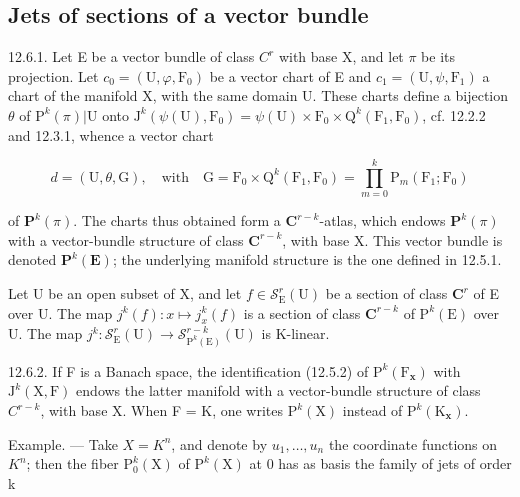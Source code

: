 \subsection{Jets of sections of a vector bundle}

12.6.1. Let E be a vector bundle of class \(C^{r}\) with base X, and let \(\pi\) be its projection. Let \(c_{0} = (\mathrm{U}, \varphi, \mathrm{F}_{0})\) be a vector chart of E and \(c_{1} = (\mathrm{U}, \psi, \mathrm{F}_{1})\) a chart of the manifold X, with the same domain U. These charts define a bijection \(\theta\) of \(\mathrm{P}^{k}(\pi)|\mathrm{U}\) onto \(\mathrm{J}^{k}(\psi(\mathrm{U}), \mathrm{F}_{0}) = \psi(\mathrm{U}) \times \mathrm{F}_{0} \times \mathrm{Q}^{k}(\mathrm{F}_{1}, \mathrm{F}_{0})\), cf. 12.2.2 and 12.3.1, whence a vector chart

\[
d = (\mathrm{U}, \theta, \mathrm{G}), \quad \text{with}\quad \mathrm{G} = \mathrm{F}_{0}\times\mathrm{Q}^{k}(\mathrm{F}_{1},\mathrm{F}_{0}) = \prod_{m=0}^{k}\mathrm{P}_{m}(\mathrm{F}_{1};\mathrm{F}_{0})
\]

of \(\mathbf{P}^{k}(\pi)\). The charts thus obtained form a \(\mathbf{C}^{r - k}\)-atlas, which endows \(\mathbf{P}^{k}(\pi)\) with a vector-bundle structure of class \(\mathbf{C}^{r - k}\), with base X. This vector bundle is denoted \(\mathbf{P}^{k}(\mathbf{E})\); the underlying manifold structure is the one defined in 12.5.1.

Let U be an open subset of X, and let \(f \in \mathcal{S}_{\mathrm{E}}^{r}(\mathrm{U})\) be a section of class \(\mathbf{C}^{r}\) of E over U. The map \(j^{k}(f): x \mapsto j_{x}^{k}(f)\) is a section of class \(\mathbf{C}^{r - k}\) of \(\mathrm{P}^{k}(\mathrm{E})\) over U. The map \(j^{k}: \mathcal{S}_{\mathrm{E}}^{r}(\mathrm{U}) \to \mathcal{S}_{\mathrm{P}^{k}(\mathrm{E})}^{r - k}(\mathrm{U})\) is K-linear.

12.6.2. If F is a Banach space, the identification (12.5.2) of \(\mathrm{P}^{k}(\mathrm{F}_{\mathbf{x}})\) with \(\mathrm{J}^{k}(\mathrm{X},\mathrm{F})\) endows the latter manifold with a vector-bundle structure of class \(C^{r-k}\), with base X. When F = K, one writes \(\mathrm{P}^{k}(\mathrm{X})\) instead of \(\mathrm{P}^{k}(\mathrm{K}_{\mathbf{x}})\).

Example. --- Take \(X = K^{n}\), and denote by \(u_{1}, \ldots, u_{n}\) the coordinate functions on \(K^{n}\); then the fiber \(\mathrm{P}_{0}^{k}(\mathrm{X})\) of \(\mathrm{P}^{k}(\mathrm{X})\) at 0 has as basis the family of jets of order k

